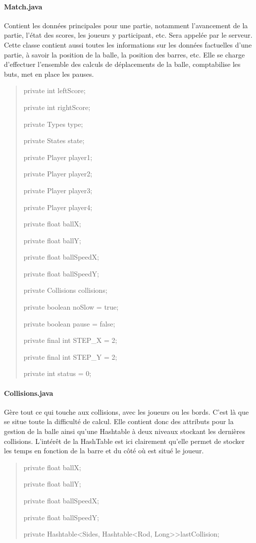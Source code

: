 \documentclass[a4paper,12pt]{report}
\begin{document}
\paragraph{Match.java}
Contient les données principales pour une partie, notamment l'avancement de la partie, l'état des scores, les joueurs y participant, etc. Sera appelée par le serveur. Cette classe contient aussi toutes les informations sur les données factuelles d'une partie, à savoir la position de la balle, la position des barres, etc. Elle se charge d'effectuer l'ensemble des calculs de déplacements de la balle, comptabilise les buts, met en place les pauses.
\begin{quote}
    private int leftScore;
    
	private int rightScore;
	
	private Types type;
	
	private States state;
	
	
	private Player player1;
	
	private Player player2;
	
	private Player player3;
	
	private Player player4;
	
	
	
	private float ballX;
	
	private float ballY;
	
	private float ballSpeedX;
	
	private float ballSpeedY;
	
	
	private Collisions collisions;



	private boolean noSlow = true;

	

	private boolean pause = false;



	private final int STEP\_X = 2;

	private final int STEP\_Y = 2;

	

	private int status = 0;
\end{quote}

\paragraph{Collisions.java}
Gère tout ce qui touche aux collisions, avec les joueurs ou les bords. C'est là que se situe toute la difficulté de calcul. Elle contient donc des attributs pour la gestion de la balle ainsi qu'une Hashtable à deux niveaux stockant les dernières collisions. L'intérêt de la HashTable est ici clairement qu'elle permet de stocker les temps en fonction de la barre et du côté où est situé le joueur.
\begin{quote}
	private float ballX;
	
	private float ballY;
	
	private float ballSpeedX;
	
	private float ballSpeedY;
	
	
	
	private Hashtable\textless Sides, Hashtable\textless Rod, Long\textgreater\textgreater lastCollision;
\end{quote}
\end{document}
